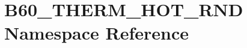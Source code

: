 \hypertarget{namespace_b60___t_h_e_r_m___h_o_t___r_n_d}{}\section{B60\+\_\+\+T\+H\+E\+R\+M\+\_\+\+H\+O\+T\+\_\+\+R\+ND Namespace Reference}
\label{namespace_b60___t_h_e_r_m___h_o_t___r_n_d}
